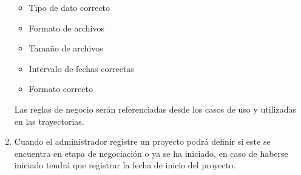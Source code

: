 \begin{enumerate}[{\bf RF01.}]
\begin{itemize}
		\item Tipo de dato correcto
		\item Formato de archivos
		\item Tamaño de archivos
		\item Intervalo de fechas correctas
		\item Formato correcto
	\end{itemize}
	Las reglas de negocio serán referenciadas desde los casos de uso y utilizadas en las trayectorias.
 \item Cuando el administrador registre un proyecto podrá definir si este se encuentra en etapa de negociación o ya se ha iniciado, en caso de haberse iniciado tendrá
 que registrar la fecha de inicio del proyecto.
\end{enumerate}



